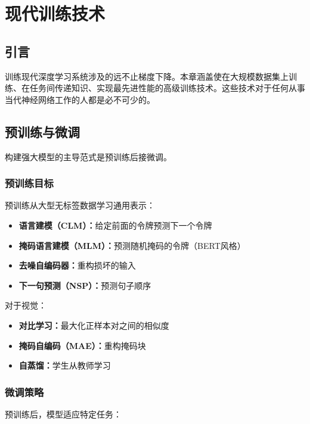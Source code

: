 \clearpage
\cleardoublepage

\chapter{现代训练技术}

\section{引言}

训练现代深度学习系统涉及的远不止梯度下降。本章涵盖使在大规模数据集上训练、在任务间传递知识、实现最先进性能的高级训练技术。这些技术对于任何从事当代神经网络工作的人都是必不可少的。

\section{预训练与微调}

构建强大模型的主导范式是预训练后接微调。

\subsection{预训练目标}

预训练从大型无标签数据学习通用表示：

\begin{itemize}
    \item \textbf{语言建模（CLM）：}给定前面的令牌预测下一个令牌
    \item \textbf{掩码语言建模（MLM）：}预测随机掩码的令牌（BERT风格）\cite{devlin2018bert}
    \item \textbf{去噪自编码器：}重构损坏的输入
    \item \textbf{下一句预测（NSP）：}预测句子顺序
\end{itemize}

对于视觉：
\begin{itemize}
    \item \textbf{对比学习：}最大化正样本对之间的相似度 \cite{chen2020simple}
    \item \textbf{掩码自编码（MAE）：}重构掩码块 \cite{he2022masked}
    \item \textbf{自蒸馏：}学生从教师学习
\end{itemize}

\subsection{微调策略}

预训练后，模型适应特定任务：

